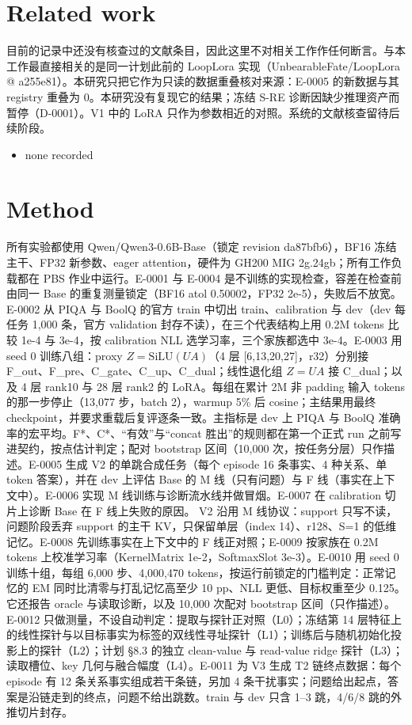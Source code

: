 \documentclass[11pt]{article}
\begin{document}
\section{Related work}

目前的记录中还没有核查过的文献条目，因此这里不对相关工作作任何断言。与本工作最直接相关的是同一计划此前的 LoopLora 实现（UnbearableFate/LoopLora @ a255e81）。本研究只把它作为只读的数据重叠核对来源：E-0005 的新数据与其 registry 重叠为 0。本研究没有复现它的结果；冻结 S-RE 诊断因缺少推理资产而暂停（D-0001）。V1 中的 LoRA 只作为参数相近的对照。系统的文献核查留待后续阶段。

\begin{itemize}
\item none recorded
\end{itemize}

\section{Method}

所有实验都使用 Qwen/Qwen3-0.6B-Base（锁定 revision da87bfb6），BF16 冻结主干、FP32 新参数、eager attention，硬件为 GH200 MIG 2g.24gb；所有工作负载都在 PBS 作业中运行。E-0001 与 E-0004 是不训练的实现检查，容差在检查前由同一 Base 的重复测量锁定（BF16 atol 0.50002，FP32 2e-5），失败后不放宽。E-0002 从 PIQA 与 BoolQ 的官方 train 中切出 train、calibration 与 dev（dev 每任务 1,000 条，官方 validation 封存不读），在三个代表结构上用 0.2M tokens 比较 1e-4 与 3e-4，按 calibration NLL 选学习率，三个家族都选中 3e-4。E-0003 用 seed 0 训练八组：proxy $Z=\mathrm{SiLU}(UA)$（4 层 [6,13,20,27]，r32）分别接 F\_out、F\_pre、C\_gate、C\_up、C\_dual；线性退化组 $Z=UA$ 接 C\_dual；以及 4 层 rank10 与 28 层 rank2 的 LoRA。每组在累计 2M 非 padding 输入 tokens 的那一步停止（13,077 步，batch 2），warmup 5\% 后 cosine；主结果用最终 checkpoint，并要求重载后复评逐条一致。主指标是 dev 上 PIQA 与 BoolQ 准确率的宏平均。F*、C*、“有效”与“concat 胜出”的规则都在第一个正式 run 之前写进契约，按点估计判定；配对 bootstrap 区间（10,000 次，按任务分层）只作描述。E-0005 生成 V2 的单跳合成任务（每个 episode 16 条事实、4 种关系、单 token 答案），并在 dev 上评估 Base 的 M 线（只有问题）与 F 线（事实在上下文中）。E-0006 实现 M 线训练与诊断流水线并做冒烟。E-0007 在 calibration 切片上诊断 Base 在 F 线上失败的原因。 V2 沿用 M 线协议：support 只写不读，问题阶段丢弃 support 的主干 KV，只保留单层（index 14）、r128、S=1 的低维记忆。E-0008 先训练事实在上下文中的 F 线正对照；E-0009 按家族在 0.2M tokens 上校准学习率（KernelMatrix 1e-2，SoftmaxSlot 3e-3）。E-0010 用 seed 0 训练十组，每组 6,000 步、4,000,470 tokens，按运行前锁定的门槛判定：正常记忆的 EM 同时比清零与打乱记忆高至少 10 pp、NLL 更低、目标权重至少 0.125。它还报告 oracle 与读取诊断，以及 10,000 次配对 bootstrap 区间（只作描述）。E-0012 只做测量，不设自动判定：提取与探针正对照（L0）；冻结第 14 层特征上的线性探针与以目标事实为标签的双线性寻址探针（L1）；训练后与随机初始化投影上的探针（L2）；计划 §8.3 的独立 clean-value 与 read-value ridge 探针（L3）；读取槽位、key 几何与融合幅度（L4）。E-0011 为 V3 生成 T2 链终点数据：每个 episode 有 12 条关系事实组成若干条链，另加 4 条干扰事实；问题给出起点，答案是沿链走到的终点，问题不给出跳数。train 与 dev 只含 1--3 跳，4/6/8 跳的外推切片封存。
\end{document}
